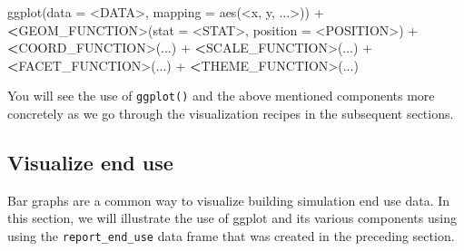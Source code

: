 \documentclass[
]{book}
\newenvironment{Shaded}{\begin{snugshade}}{\end{snugshade}}
\newcommand{\AttributeTok}[1]{\textcolor[rgb]{0.77,0.63,0.00}{#1}}
\newcommand{\ErrorTok}[1]{\textcolor[rgb]{0.64,0.00,0.00}{\textbf{#1}}}
\newcommand{\FunctionTok}[1]{\textcolor[rgb]{0.00,0.00,0.00}{#1}}
\newcommand{\NormalTok}[1]{#1}
\newcommand{\SpecialCharTok}[1]{\textcolor[rgb]{0.00,0.00,0.00}{#1}}
\begin{document}
\begin{Shaded}
\begin{Highlighting}[]
\FunctionTok{ggplot}\NormalTok{(}\AttributeTok{data =} \SpecialCharTok{\textless{}}\NormalTok{DATA}\SpecialCharTok{\textgreater{}}\NormalTok{, }\AttributeTok{mapping =} \FunctionTok{aes}\NormalTok{(}\SpecialCharTok{\textless{}}\NormalTok{x, y, ...}\SpecialCharTok{\textgreater{}}\NormalTok{)) }\SpecialCharTok{+}
    \ErrorTok{\textless{}}\NormalTok{GEOM\_FUNCTION}\SpecialCharTok{\textgreater{}}\NormalTok{(}\AttributeTok{stat =} \SpecialCharTok{\textless{}}\NormalTok{STAT}\SpecialCharTok{\textgreater{}}\NormalTok{, }\AttributeTok{position =} \SpecialCharTok{\textless{}}\NormalTok{POSITION}\SpecialCharTok{\textgreater{}}\NormalTok{) }\SpecialCharTok{+}
    \ErrorTok{\textless{}}\NormalTok{COORD\_FUNCTION}\SpecialCharTok{\textgreater{}}\NormalTok{(...) }\SpecialCharTok{+}
    \ErrorTok{\textless{}}\NormalTok{SCALE\_FUNCTION}\SpecialCharTok{\textgreater{}}\NormalTok{(...) }\SpecialCharTok{+}
    \ErrorTok{\textless{}}\NormalTok{FACET\_FUNCTION}\SpecialCharTok{\textgreater{}}\NormalTok{(...) }\SpecialCharTok{+}
    \ErrorTok{\textless{}}\NormalTok{THEME\_FUNCTION}\SpecialCharTok{\textgreater{}}\NormalTok{(...)}
\end{Highlighting}
\end{Shaded}

You will see the use of \texttt{ggplot()} and the above mentioned components more concretely as we go through the visualization recipes in the subsequent sections.

\hypertarget{visualize-end-use}{%
\subsection{Visualize end use}\label{visualize-end-use}}

Bar graphs are a common way to visualize building simulation end use data. In this section, we will illustrate the use of ggplot and its various components using using the \texttt{report\_end\_use} data frame that was created in the preceding section.
\end{document}
